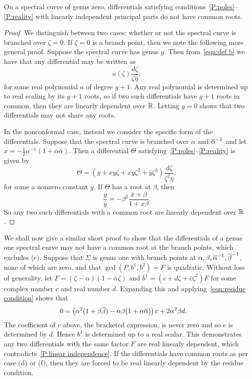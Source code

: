 \documentclass{article}
\begin{document}
\begin{lem}\label{lem:no singularities}
On a spectral curve of genus zero, differentials satisfying conditions~\ref{P:poles}--\ref{P:reality} with linearly independent principal parts do not have common roots.
\begin{proof}
We distinguish between two cases: whether or not the spectral curve is branched over $\zeta=0$. If $\zeta=0$ is a branch point, then we note the following more general proof. Suppose the spectral curve has genus $g$. Then from~\eqref{eqn:def b} we have that any differential may be written as 
\[
a(\zeta)\frac{d\zeta}{\zeta\eta},
\]
for some real polynomial $a$ of degree $g+1$. Any real polynomial is determined up to real scaling by its $g+1$ roots, so if two such differentials have $g+1$ roots in common, then they are linearly dependent over $\mathbb{R}$. Letting $g=0$ shows that two differentials may not share any roots.

In the nonconformal case, instead we consider the specific form of the differentials. Suppose that the spectral curve is branched over $\alpha$ and $\overline{\alpha}^{-1}$ and let $x = -\frac{1}{2}\alpha^{-1}(1+\alpha\bar{\alpha})$. Then a differential $\Theta$ satisfying~\ref{P:poles}--\ref{P:reality} is given by
\[
\Theta = (y + xy \zeta + \overline{xy}\zeta^2 + \bar{y}\zeta^3)\frac{d\zeta}{\zeta^2\eta},
\]
for some a nonzero constant $y$. If $\Theta$ has a root at $\beta$, then 
\[
\frac{y}{\bar{y}} = -\beta^2 \frac{\bar{x} + \beta}{1+x\beta}.
\]
So any two such differentials with a common root are linearly dependent over $\mathbb{R}$.
\end{proof}
\end{lem}


We shall now give a similar short proof to show that the differentials of a genus one spectral curve may not have a common root at the branch points, which excludes (c). Suppose that $\Sigma$ is genus one with branch points at $\alpha,\beta,\overline{\alpha}^{-1},\overline{\beta}^{-1}$, none of which are zero, and that $\gcd(P,b^1,b^2) = F$ is quadratic. Without loss of generality, let $F = (\zeta-\alpha)(1-\bar{\alpha}\zeta)$ and $b^1 = (c + d\zeta + \bar{c}\zeta^2)F$ for some complex number $c$ and real number $d$. Expanding this and applying~\eqref{eqn:residue condition} shows that
\begin{align*}
0 
&= \left( \alpha^2(1+\beta\overline{\beta}) - \alpha\beta(1+\alpha\overline{\alpha}) \right)c + 2\alpha^2\beta d.
\end{align*}
The coefficient of $c$ above, the bracketed expression, is never zero and so $c$ is determined by $d$. Hence $b^1$ is determined up to a real scalar. This demonstrates any two differentials with the same factor $F$ are real linearly dependent, which contradicts~\ref{P:linear independence}. If the differentials have common roots as per case (d) or (f), then they are forced to be real linearly dependent by the residue condition.
\end{document}
